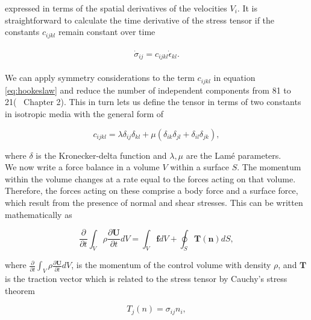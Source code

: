 expressed in terms of the spatial derivatives of the velocities $V_i$. It is straightforward to calculate the time derivative
of the stress tensor if the constants $c_{ijkl}$ remain constant over time

\begin{align}
    \begin{split}
        \dot{\sigma}_{ij} = c_{ijkl}\dot{\epsilon}_{kl} .
    \end{split}
    \label{eq:stress}
\end{align}

We can apply symmetry considerations to the term $c_{ijkl}$ in equation \ref{eq:hookeslaw} and reduce the number of independent components from 81 to 21(~\parencite{aki2002quantitative} Chapter 2).
This in turn lets us define the tensor in terms of two constants in isotropic media with the general form of

\begin{equation}
    c_{ijkl} = \lambda \delta_{ij}\delta_{kl} + \mu\left(\delta_{ik}\delta_{jl} + \delta_{il}\delta_{jk}\right),
    \label{eq:isotropic}
\end{equation}

where $\delta$ is the Kronecker-delta function and $\lambda, \mu$ are the Lam\'e parameters. \\

We now write a force balance in a volume $V$ within a surface $S$. The momentum within the volume changes at a rate equal
to the forces acting on that volume. Therefore, the forces acting on these comprise a body force and a surface force, which result
from the presence of normal and shear stresses. This can be written mathematically as 

\begin{equation}
    \frac{\partial}{\partial t} \int_V \rho \frac{\partial \mathbf{U}}{\partial t}dV = \int_V \mathbf{f}dV + \oint_S \mathbf{T\left(n\right)}dS,
    \label{eq:forcebalance}
\end{equation}

where $\frac{\partial}{\partial t} \int_V \rho \frac{\partial \mathbf{U}}{\partial t}dV$, is the momentum of the control volume with density $\rho$, and $\mathbf{T}$
is the traction vector which is related to the stress tensor by Cauchy's stress theorem ~\parencite{cauchy-stress-theorem}

\begin{equation}
    T_j\left(n\right) = \sigma_{ij}n_i,
\end{equation}

